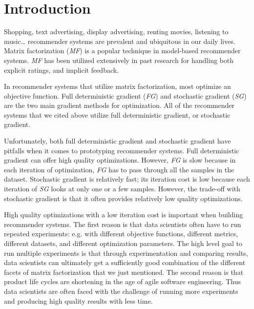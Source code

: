 \section{Introduction}
Shopping, text advertising, display advertising, renting movies, listening to music… recommender systems are prevalent and ubiquitous in our daily lives.  
Matrix factorization (\emph{MF}) is a popular technique in model-based recommender systems.  
\emph{MF} has been utilized extensively in past research for handling both explicit \cite{mmmf2005fast, mnar, gapfm} ratings, and implicit \cite{wrmf2008hu, wrmf2008pan, climf, bpr, mnar} feedback.  

In recommender systems that utilize matrix factorization, most optimize an objective function.  
Full deterministic gradient (\emph{FG}) and stochastic gradient (\emph{SG}) are the two main gradient methods for optimization.  
All of the recommender systems that we cited above utilize full deterministic gradient, or stochastic gradient.

Unfortunately, both full deterministic gradient and stochastic gradient have pitfalls when it comes to prototyping recommender systems.  
Full deterministic gradient can offer high quality optimizations.  
However, \emph{FG} is slow because in each iteration of optimization, \emph{FG} has to pass through all the samples in the dataset.  
Stochastic gradient is relatively fast; its iteration cost is low because each iteration of \emph{SG} looks at only one or a few samples.  
However, the trade-off with stochastic gradient is that it often provides relatively low quality optimizations.  

High quality optimizations with a low iteration cost is important when building recommender systems.  
The first reason is that data scientists often have to run repeated experiments: e.g. with different objective functions, different metrics, different datasets, and different optimization parameters.  
The high level goal to run multiple experiments is that through experimentation and comparing results, 
data scientists can ultimately get a sufficiently good combination of the different facets of matrix factorization that we just mentioned.  
The second reason is that product life cycles are shortening in the age of agile software engineering.  
Thus data scientists are often faced with the challenge of running more experiments and producing high quality results with less time.  

